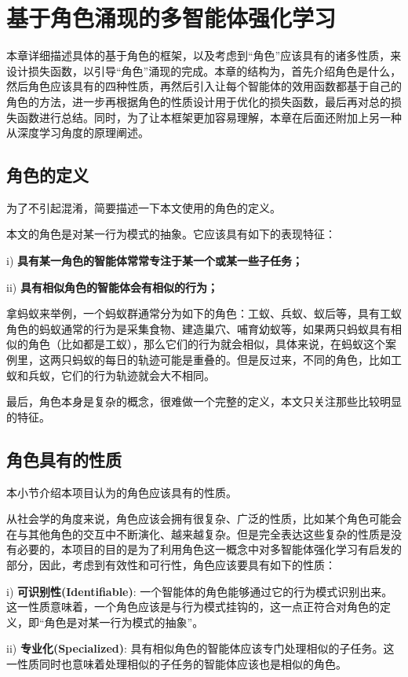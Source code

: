
\chapter{基于角色涌现的多智能体强化学习}
本章详细描述具体的基于角色的框架，以及考虑到“角色”应该具有的诸多性质，来设计损失函数，以引导“角色”涌现的完成。本章的结构为，首先介绍角色是什么，然后角色应该具有的四种性质，再然后引入让每个智能体的效用函数都基于自己的角色的方法，进一步再根据角色的性质设计用于优化的损失函数，最后再对总的损失函数进行总结。同时，为了让本框架更加容易理解，本章在后面还附加上另一种从深度学习角度的原理阐述。

\section{角色的定义}
为了不引起混淆，简要描述一下本文使用的角色的定义。

本文的角色是对某一行为模式的抽象。它应该具有如下的表现特征：

i) \textbf{具有某一角色的智能体常常专注于某一个或某一些子任务；}

ii) \textbf{具有相似角色的智能体会有相似的行为；}

拿蚂蚁来举例，一个蚂蚁群通常分为如下的角色：工蚁、兵蚁、蚁后等，具有工蚁角色的蚂蚁通常的行为是采集食物、建造巢穴、哺育幼蚁等，如果两只蚂蚁具有相似的角色（比如都是工蚁），那么它们的行为就会相似，具体来说，在蚂蚁这个案例里，这两只蚂蚁的每日的轨迹可能是重叠的。但是反过来，不同的角色，比如工蚁和兵蚁，它们的行为轨迹就会大不相同。

最后，角色本身是复杂的概念，很难做一个完整的定义，本文只关注那些比较明显的特征。


\section{角色具有的性质}
本小节介绍本项目认为的角色应该具有的性质。

从社会学的角度来说，角色应该会拥有很复杂、广泛的性质，比如某个角色可能会在与其他角色的交互中不断演化、越来越复杂。但是完全表达这些复杂的性质是没有必要的，本项目的目的是为了利用角色这一概念中对多智能体强化学习有启发的部分，因此，考虑到有效性和可行性，角色应该要具有如下的性质：

i) \textbf{可识别性(Identifiable)}: 一个智能体的角色能够通过它的行为模式识别出来。这一性质意味着，一个角色应该是与行为模式挂钩的，这一点正符合对角色的定义，即“角色是对某一行为模式的抽象”。

ii) \textbf{专业化(Specialized)}: 具有相似角色的智能体应该专门处理相似的子任务。这一性质同时也意味着处理相似的子任务的智能体应该也是相似的角色。

